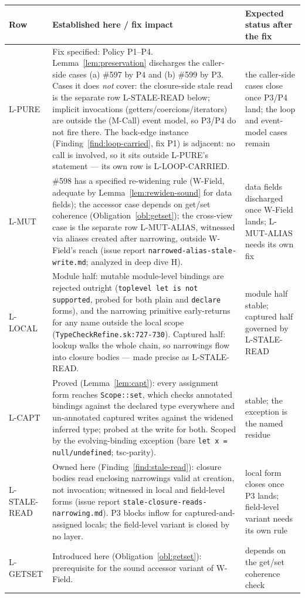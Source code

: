 \documentclass[11pt]{article}
\begin{document}
\begingroup
\renewcommand{\arraystretch}{1.3}
\small
\begin{longtable}{@{}p{2.0cm}p{8.6cm}p{3.4cm}@{}}
\toprule
\textbf{Row} & \textbf{Established here / fix impact} &
\textbf{Expected status after the fix} \\
\midrule
\endhead
L-PURE & Fix specified: Policy P1--P4. Lemma~\ref{lem:preservation}
  discharges the caller-side cases (a) \#597 by P4 and (b)
  \#599 by P3. Cases it does \emph{not} cover: the closure-side
  stale read is the separate row L-STALE-READ below; implicit
  invocations (getters/coercions/iterators) are outside the (M-Call)
  event model, so P3/P4 do not fire there. The back-edge instance
  (Finding~\ref{find:loop-carried}, fix P1) is adjacent: no call is
  involved, so it sits outside L-PURE's statement — its own row is
  L-LOOP-CARRIED. &
  the caller-side cases close once P3/P4 land; the loop and
  event-model cases remain \\
L-MUT & \#598 has a specified re-widening rule (W-Field, adequate by
  Lemma~\ref{lem:rewiden-sound} for data fields); the accessor case
  depends on get/set coherence (Obligation~\ref{obl:getset}); the
  cross-view case is the separate row L-MUT-ALIAS, witnessed via
  aliases created after narrowing, outside W-Field's reach (issue report
  \texttt{narrowed-alias-stale-write.md}; analyzed in deep dive H). &
  data fields discharged once W-Field lands; L-MUT-ALIAS needs its
  own fix \\
L-LOCAL & Module half: mutable module-level bindings are rejected
  outright (\texttt{toplevel let is not supported}, probed for both
  plain and \texttt{declare} forms), and the narrowing primitive
  early-returns for any name outside the local scope
  (\texttt{TypeCheckRefine.sk:727-730}). Captured half: lookup walks
  the whole chain, so narrowings flow into closure bodies — made
  precise as L-STALE-READ. &
  module half stable; captured half governed by L-STALE-READ \\
L-CAPT & Proved (Lemma~\ref{lem:capt}): every assignment form reaches
  \texttt{Scope::set}, which checks annotated bindings against the
  declared type everywhere and un-annotated captured writes against the
  widened inferred type; probed at the write for both. Scoped by the
  evolving-binding exception (bare \texttt{let x = null/undefined};
  tsc-parity). &
  stable; the exception is the named residue \\
L-STALE-READ & Owned here (Finding~\ref{find:stale-read}): closure
  bodies read enclosing narrowings valid at creation, not invocation;
  witnessed in local and field-level forms (issue report
  \texttt{stale-closure-reads-narrowing.md}). P3 blocks inflow for
  captured-and-assigned locals; the field-level variant is closed by no
  layer. &
  local form closes once P3 lands; field-level variant needs its own
  rule \\
L-GETSET & Introduced here (Obligation~\ref{obl:getset}):
  prerequisite for the sound accessor variant of W-Field. &
  depends on the get/set coherence check \\
\bottomrule
\end{longtable}
\endgroup
\end{document}
